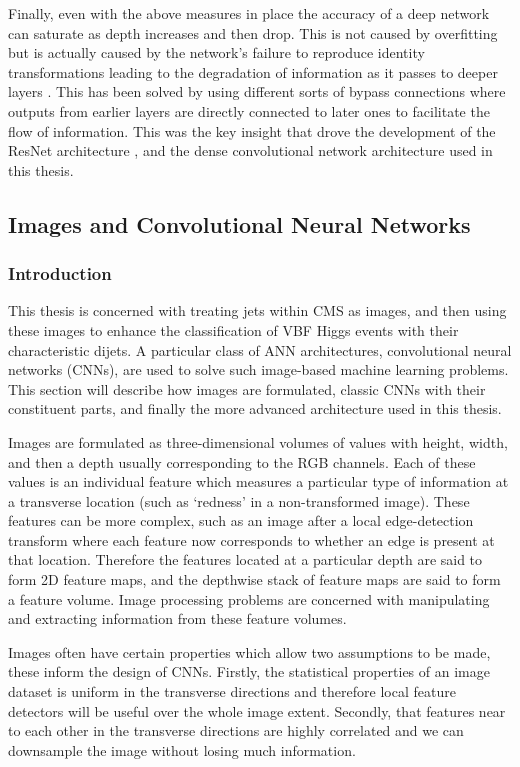 Finally, even with the above measures in place the accuracy of a deep network can saturate as depth increases and then drop. This is not caused by overfitting but is actually caused by the network's failure to reproduce identity transformations leading to the degradation of information as it passes to deeper layers \cite{ResNet}. This has been solved by using different sorts of bypass connections where outputs from earlier layers are directly connected to later ones to facilitate the flow of information. This was the key insight that drove the development of the ResNet architecture \cite{ResNet}, and the dense convolutional network architecture used in this thesis.  


\subsection{Images and Convolutional Neural Networks}

\subsubsection{Introduction}
This thesis is concerned with treating jets within CMS as images, and then using these images to enhance the classification of VBF Higgs events with their characteristic dijets. 
A particular class of ANN architectures, convolutional neural networks (CNNs), are used to solve such image-based machine learning problems.
This section will describe how images are formulated, classic CNNs with their constituent parts, and finally the more advanced architecture used in this thesis. 


Images are formulated as three-dimensional volumes of values with height, width, and then a depth usually corresponding to the RGB channels. 
Each of these values is an individual feature which measures a particular type of information at a transverse location (such as `redness' in a non-transformed image). 
These features can be more complex, such as an image after a local edge-detection transform where each feature now corresponds to whether an edge is present at that location. 
Therefore the features located at a particular depth are said to form 2D feature maps, and the depthwise stack of feature maps are said to form a feature volume. 
Image processing problems are concerned with manipulating and extracting information from these feature volumes.

Images often have certain properties which allow two assumptions to be made, these inform the design of CNNs. 
Firstly, the statistical properties of an image dataset is uniform in the transverse directions and therefore local feature detectors will be useful over the whole image extent. 
Secondly, that features near to each other in the transverse directions are highly correlated and we can downsample the image without losing much information. 


